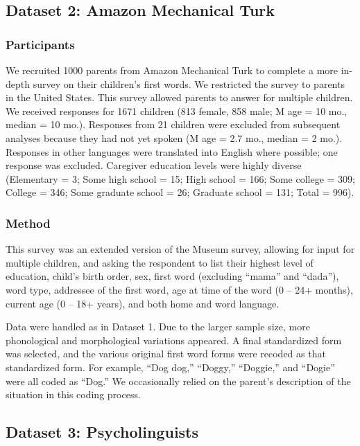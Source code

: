 \documentclass[10pt,letterpaper]{article}
\begin{document}
\subsection{Dataset 2: Amazon Mechanical Turk}

\subsubsection{Participants}

We recruited 1000 parents from Amazon Mechanical Turk to complete a more in-depth survey on their children's first words. We restricted the survey to parents in the United States. This survey allowed parents to answer for multiple children. We received responses for 1671 children (813 female, 858 male; M age = 10 mo., median = 10 mo.). Responses from 21 children were excluded from subsequent analyses because they had not yet spoken (M age = 2.7 mo., median = 2 mo.). Responses in other languages were translated into English where possible; one response was excluded. Caregiver education levels were highly diverse (Elementary = 3; Some high school = 15; High school = 166; Some college = 309; College = 346; Some graduate school = 26; Graduate school = 131; Total = 996).

\subsubsection{Method}

This survey was an extended version of the Museum survey, allowing for input for multiple children, and asking the respondent to list their highest level of education, child's birth order, sex, first word (excluding ``mama'' and ``dada''), word type, addressee of the first word, age at time of the word (0 -- 24+ months), current age (0 -- 18+ years), and both home and word language.

Data were handled as in Dataset 1. Due to the larger sample size, more phonological and morphological variations appeared. A final standardized form was selected, and the various original first word forms were recoded as that standardized form. For example, ``Dog dog,'' ``Doggy,'' ``Doggie,'' and ``Dogie'' were all coded as ``Dog.'' We occasionally relied on the parent's description of the situation in this coding process.

\subsection{Dataset 3: Psycholinguists }
\end{document}
